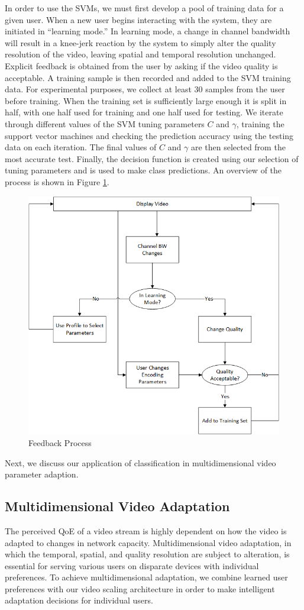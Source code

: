 In order to use the SVMs, we must first develop a pool of training data for a given user. When a new user begins interacting with the system, they are initiated in ``learning mode.'' In learning mode, a change in channel bandwidth will result in a knee-jerk reaction by the system to simply alter the quality resolution of the video, leaving spatial and temporal resolution unchanged. Explicit feedback is obtained from the user by asking if the video quality is acceptable. A training sample is then recorded and added to the SVM training data. For experimental purposes, we collect at least 30 samples from the user before training. When the training set is sufficiently large enough it is split in half, with one half used for training and one half used for testing. We iterate through different values of the SVM tuning parameters $C$ and $\gamma$, training the support vector machines and checking the prediction accuracy using the testing data on each iteration. The final values of $C$ and $\gamma$ are then selected from the most accurate test. Finally, the decision function is created using our selection of tuning parameters and is used to make class predictions. An overview of the process is shown in Figure \ref{fig:Feedback}.
\begin{figure}[H]
\centering
\includegraphics[width=0.5\linewidth]{images/BandwidthChangeDecisionTree.png}
\caption{Feedback Process}
\label{fig:Feedback}
\end{figure}

Next, we discuss our application of classification in multidimensional video parameter adaption. 

\subsection{Multidimensional Video Adaptation}
The perceived QoE of a video stream is highly dependent on how the video is adapted to changes in network capacity. Multidimensional video adaptation, in which the temporal, spatial, and quality resolution are subject to alteration, is essential for serving various users on disparate devices with individual preferences. To achieve multidimensional adaptation, we combine learned user preferences with our video scaling architecture in order to make intelligent adaptation decisions for individual users.

